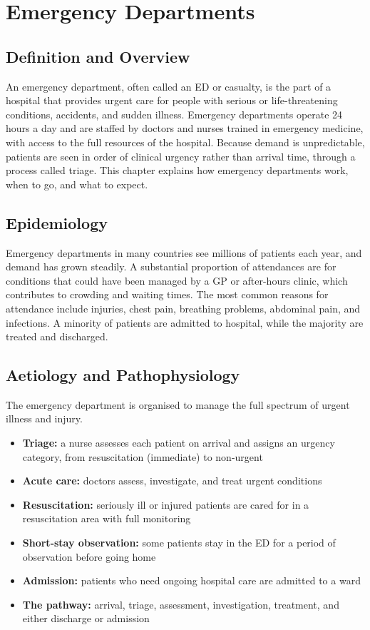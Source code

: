 \chapter{Emergency Departments}

\section*{Definition and Overview}
An emergency department, often called an ED or casualty, is the part of a hospital that provides urgent care for people with serious or life-threatening conditions, accidents, and sudden illness. Emergency departments operate 24 hours a day and are staffed by doctors and nurses trained in emergency medicine, with access to the full resources of the hospital. Because demand is unpredictable, patients are seen in order of clinical urgency rather than arrival time, through a process called triage. This chapter explains how emergency departments work, when to go, and what to expect.

\section*{Epidemiology}
Emergency departments in many countries see millions of patients each year, and demand has grown steadily. A substantial proportion of attendances are for conditions that could have been managed by a GP or after-hours clinic, which contributes to crowding and waiting times. The most common reasons for attendance include injuries, chest pain, breathing problems, abdominal pain, and infections. A minority of patients are admitted to hospital, while the majority are treated and discharged.

\section*{Aetiology and Pathophysiology}
The emergency department is organised to manage the full spectrum of urgent illness and injury.
\begin{itemize}
    \item \textbf{Triage:} a nurse assesses each patient on arrival and assigns an urgency category, from resuscitation (immediate) to non-urgent
    \item \textbf{Acute care:} doctors assess, investigate, and treat urgent conditions
    \item \textbf{Resuscitation:} seriously ill or injured patients are cared for in a resuscitation area with full monitoring
    \item \textbf{Short-stay observation:} some patients stay in the ED for a period of observation before going home
    \item \textbf{Admission:} patients who need ongoing hospital care are admitted to a ward
    \item \textbf{The pathway:} arrival, triage, assessment, investigation, treatment, and either discharge or admission
\end{itemize}

